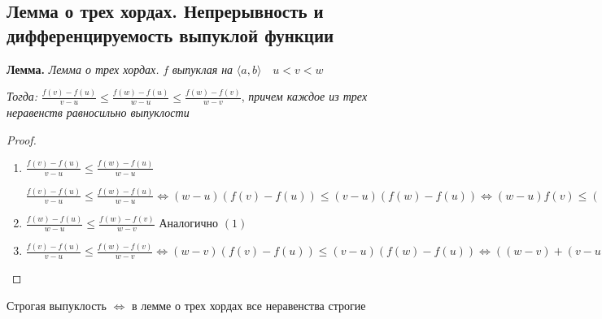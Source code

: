 \subsection{Лемма о трех хордах. Непрерывность и дифференцируемость выпуклой функции \href{https://youtu.be/CAxh8kYEOlQ?t=4860}{\Walley}}

\textbf{Лемма.}
\textit{
    Лемма о трех хордах.
} \quad $f$ \textit{
    выпуклая на 
} $\langle a, b \rangle \quad u < v < w$

\textit{Тогда: }$\frac{f(v) - f(u)}{v - u} \leqslant \frac{f(w) - f(u)}{w - u} \leqslant \frac{f(w) - f(v)}{w - v}$,
\textit{
    причем каждое из трех неравенств равносильно выпуклости
}
\begin{proof} \quad 

    \begin{enumerate} 
        \item $\frac{f(v) - f(u)}{v - u} \leqslant \frac{f(w) - f(u)}{w - u}$

        $\frac{f(v) - f(u)}{v - u} \leqslant \frac{f(w) - f(u)}{w - u} \Longleftrightarrow (w - u)
        (f(v) - f(u)) \leqslant (v - u)(f(w) - f(u)) \Longleftrightarrow (w-u)f(v) \leqslant
        ((w - u) - (v - u))f(u) + (v - u)f(w) = (w - v)f(u) + (v - u)f(w)$ 
        \item $\frac{f(w) - f(u)}{w - u} \leqslant \frac{f(w) - f(v)}{w - v}$ \qquad
        Аналогично $(1)$
        \item $\frac{f(v) - f(u)}{v - u} \leqslant \frac{f(w) - f(v)}{w - v} \Longleftrightarrow (w - v)
        (f(v) - f(u)) \leqslant (v - u)(f(w) - f(u)) \Longleftrightarrow ((w - v) + (v - u))f(v) \leqslant (w - v)f(u) +
        (v - u)f(w) \Longleftrightarrow (w - u)f(v) \leqslant (w - v)f(u) + (v - u)f(w)$
    \end{enumerate}
\end{proof}

\notice \; Строгая выпуклость $\Longleftrightarrow$ в лемме о трех хордах все неравенства строгие

